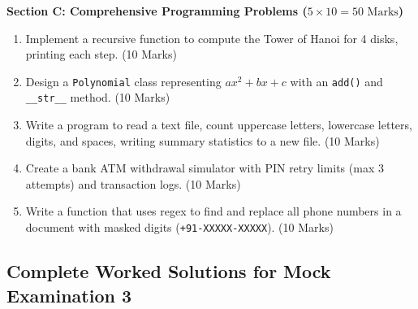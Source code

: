 \begin{mockexam}
\medskip
\noindent\textbf{Section C: Comprehensive Programming Problems ($5 \times 10 = 50\text{ Marks}$)}
\begin{enumerate}[leftmargin=1.5em, start=17]
    \item Implement a recursive function to compute the Tower of Hanoi for 4 disks, printing each step. (10 Marks)
    \item Design a \texttt{Polynomial} class representing $a x^2 + b x + c$ with an \texttt{add()} and \texttt{\_\_str\_\_} method. (10 Marks)
    \item Write a program to read a text file, count uppercase letters, lowercase letters, digits, and spaces, writing summary statistics to a new file. (10 Marks)
    \item Create a bank ATM withdrawal simulator with PIN retry limits (max 3 attempts) and transaction logs. (10 Marks)
    \item Write a function that uses regex to find and replace all phone numbers in a document with masked digits (\texttt{+91-XXXXX-XXXXX}). (10 Marks)
\end{enumerate}
\end{mockexam}

\subsection{Complete Worked Solutions for Mock Examination 3}

